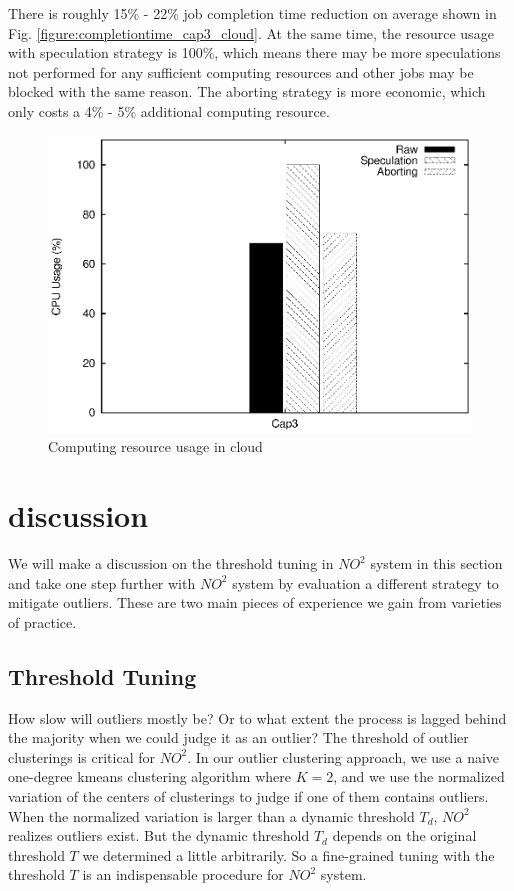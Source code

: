 There is roughly 15\% - 22\% job completion time reduction on average shown in Fig.
\ref{figure:completiontime_cap3_cloud}. At the same time, the resource usage with
speculation strategy is 100\%, which means there may be more speculations not performed
for any sufficient computing resources and other jobs may be blocked with the same reason.
The aborting strategy is more economic, which only costs a 4\% - 5\% additional computing
resource.

\begin{figure}
\centering
\includegraphics[width=0.9\columnwidth]{figures/cloud_resource_usage.eps}
\caption{Computing resource usage in cloud}
\label{figure:resourceusage_cloud}
\end{figure}

\section{discussion}

We will make a discussion on the threshold tuning in $NO^2$ system in this section and take
one step further with $NO^2$ system by evaluation a different strategy to mitigate
outliers. These are two main pieces of experience we gain from varieties of practice.

\subsection{Threshold Tuning}

How slow will outliers mostly be? Or to what extent the process is lagged behind the majority when we could
judge it as an outlier? The threshold of outlier clusterings is critical for $NO^2$. In our
outlier clustering approach, we use a naive one-degree kmeans clustering algorithm where
$K = 2$, and we use the normalized variation of the centers of clusterings to judge if one
of them contains outliers. When the normalized variation is larger than a dynamic
threshold $T_d$, $NO^2$ realizes outliers exist. But the dynamic threshold $T_d$ depends
on the original threshold $T$ we determined a little arbitrarily. So a fine-grained tuning
with the threshold $T$ is an indispensable procedure for $NO^2$ system.


